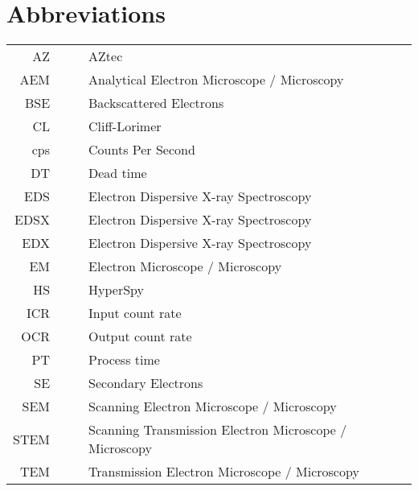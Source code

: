 \chapter*{Abbreviations}

\begin{table}[h!]
    \centering
    \begin{tabular}{rrrl}
        \hline
        AZ   &  &  & AZtec                                                  \\
        AEM  &  &  & Analytical Electron Microscope / Microscopy            \\
        BSE  &  &  & Backscattered Electrons                                \\
        CL   &  &  & Cliff-Lorimer                                          \\
        cps  &  &  & Counts Per Second                                      \\
        DT   &  &  & Dead time                                              \\
        EDS  &  &  & Electron Dispersive X-ray Spectroscopy                 \\
        EDSX &  &  & Electron Dispersive X-ray Spectroscopy                 \\
        EDX  &  &  & Electron Dispersive X-ray Spectroscopy                 \\
        EM   &  &  & Electron Microscope / Microscopy                       \\
        HS   &  &  & HyperSpy                                               \\
        ICR  &  &  & Input count rate                                       \\
        OCR  &  &  & Output count rate                                      \\
        PT   &  &  & Process time                                           \\
        SE   &  &  & Secondary Electrons                                    \\
        SEM  &  &  & Scanning Electron Microscope / Microscopy              \\
        STEM &  &  & Scanning Transmission Electron Microscope / Microscopy \\
        TEM  &  &  & Transmission Electron Microscope / Microscopy          \\
        \hline
    \end{tabular}
\end{table}

